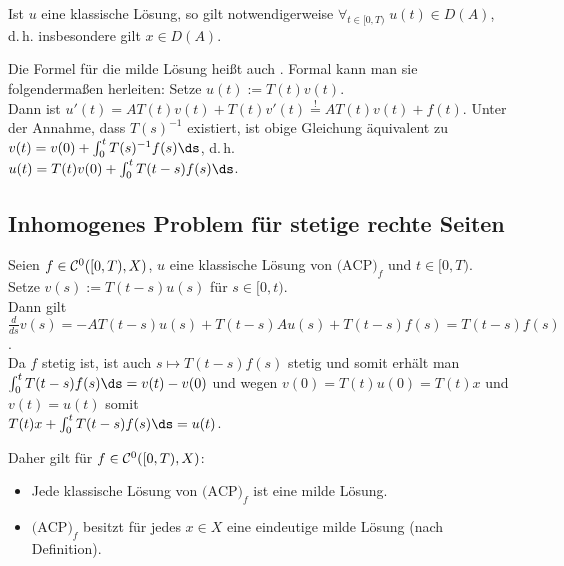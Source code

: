 \begin{Bem}
    Ist $u$ eine klassische Lösung, so gilt notwendigerweise
    $\forall_{t \in [0, T)}\; u(t) \in D(A)$, d.\,h. insbesondere gilt $x \in D(A)$.
\end{Bem}

\linie

\begin{Bem}
    Die Formel für die milde Lösung heißt auch .
    Formal kann man sie folgendermaßen herleiten:
    Setze $u(t) := T(t) v(t)$.\\
    Dann ist $u'(t) = AT(t)v(t) + T(t)v'(t) \overset{!}{=} AT(t)v(t) + f(t)$.
    Unter der Annahme, dass $T(s)^{-1}$ existiert, ist obige Gleichung äquivalent zu
    $v(t) = v(0) + \int_0^t T(s)^{-1} f(s)\ds$, d.\,h.\\
    $u(t) = T(t) v(0) + \int_0^t T(t - s) f(s)\ds$.
\end{Bem}

\pagebreak

\subsection{%
    Inhomogenes Problem für stetige rechte Seiten
}

\begin{Bem}
    Seien $f \in \mathcal{C}^0([0, T), X)$, $u$ eine klassische Lösung von $\text{(ACP)}_f$
    und $t \in [0, T)$.\\
    Setze $v(s) := T(t - s) u(s)$ für $s \in [0, t)$.\\
    Dann gilt $\frac{d}{ds} v(s) = -AT(t - s) u(s) + T(t - s) Au(s) + T(t - s) f(s) =
    T(t - s) f(s)$.\\
    Da $f$ stetig ist, ist auch $s \mapsto T(t - s) f(s)$ stetig und somit erhält man\\
    $\int_0^t T(t - s) f(s) \ds = v(t) - v(0)$ und wegen $v(0) = T(t)u(0) = T(t)x$ und $v(t) = u(t)$
    somit\\
    $T(t)x + \int_0^t T(t - s) f(s) \ds = u(t)$.
    
    Daher gilt für $f \in \mathcal{C}^0([0, T), X)$:
    \begin{itemize}
        \item
        Jede klassische Lösung von $\text{(ACP)}_f$ ist eine milde Lösung.
        
        \item
        $\text{(ACP)}_f$ besitzt für jedes $x \in X$ eine eindeutige milde Lösung
        (nach Definition).
    \end{itemize}
\end{Bem}

